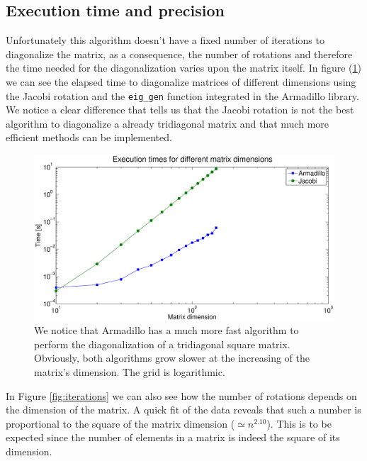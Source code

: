 \documentclass {article}
\begin{document}
\subsection{Execution time and precision}
Unfortunately this algorithm doesn't have a fixed number of iterations to diagonalize the matrix, as a consequence, the number of rotations and therefore the time needed for the diagonalization varies upon the matrix itself. In figure (\ref{pff}) we can see the  elapsed time to diagonalize matrices of different dimensions using the Jacobi rotation and the \texttt{eig\_gen} function integrated in the Armadillo library. We notice a clear difference that tells us that the Jacobi rotation is not the best algorithm to diagonalize a already tridiagonal matrix and that much more efficient methods can be implemented.

\begin{figure}[H]
	\centering
	\includegraphics[width=16cm]{times}
	\caption{We notice that Armadillo has a much more fast algorithm to perform the diagonalization of a tridiagonal square matrix. Obviously, both algorithms grow slower at the increasing of the matrix's dimension. The grid is logarithmic.}
	\label{pff}
\end{figure}

In Figure \ref{fig:iterations} we can also see how the number of rotations depends on the dimension of the matrix. A quick fit of the data reveals that such a number is proportional to the square of the matrix dimension ($\simeq n^{2.10}$). This is to be expected since the number of elements in a matrix is indeed the square of its dimension. 
\end{document}
